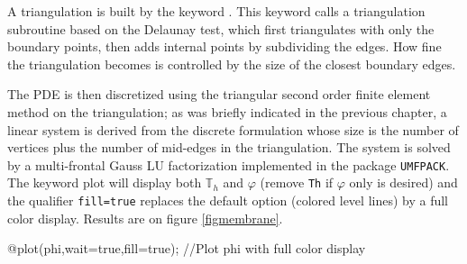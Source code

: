 \documentclass[a4paper,twoside,12pt]{book}
\def\T{\mathbb{T}}
\begin{document}
A triangulation is built by the keyword . This keyword
calls a triangulation subroutine based on the Delaunay test, which
first triangulates with only the boundary points, then adds internal
points by subdividing the edges. How fine  the triangulation becomes is controlled
by the size of the closest boundary edges.

\medskip

The PDE is then discretized using the triangular second order finite
element method on the triangulation; as was briefly indicated in the previous chapter,
a linear system is derived from the discrete formulation whose size is the number of vertices
plus the number of mid-edges in
the triangulation. The system is solved by a multi-frontal Gauss LU factorization
implemented in the package \texttt{UMFPACK}. The keyword plot will display both
$\T_h$ and $\varphi$ (remove \texttt{Th} if $\varphi$ only is desired) and the
qualifier \texttt{fill=true} replaces the default option (colored level lines) by a full color display.
Results are on figure \ref{figmembrane}.

\bFF
@plot(phi,wait=true,fill=true); //Plot phi with full color display
\eFF
\end{document}
